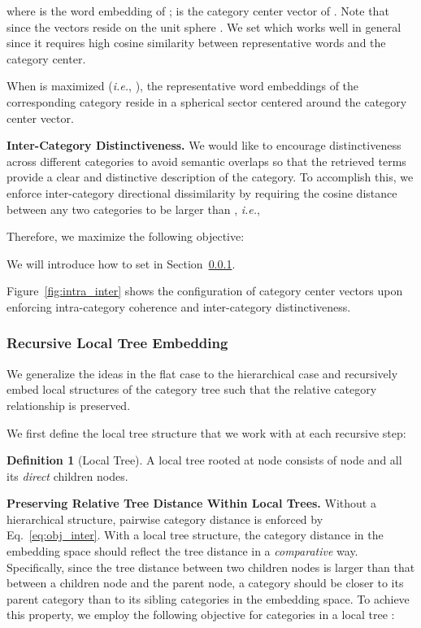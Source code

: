\documentclass[sigconf]{acmart}
\newcommand{\ie}{\emph{i.e.}}
\theoremstyle{definition}
\newtheorem{definition}{Definition}
\begin{document}
where  is the word embedding of ;  is the category center vector of . Note that  since the vectors reside on the unit sphere .
We set  which works well in general since it requires high cosine similarity between representative words and the category center.

When  is maximized (\ie, ), the representative word embeddings of the corresponding category reside in a spherical sector centered around the category center vector.

\noindent
\textbf{Inter-Category Distinctiveness.}
We would like to encourage distinctiveness across different categories to avoid semantic overlaps so that the retrieved terms provide a clear and distinctive description of the category. To accomplish this, we enforce inter-category directional dissimilarity by requiring the cosine distance between any two categories to be larger than , \ie,

Therefore, we maximize the following objective:

We will introduce how to set  in Section~\ref{sec:recursive}.

Figure~\ref{fig:intra_inter} shows the configuration of category center vectors upon enforcing intra-category coherence and inter-category distinctiveness.


\subsubsection{Recursive Local Tree Embedding}
\label{sec:recursive}
We generalize the ideas in the flat case to the hierarchical case and recursively embed local structures of the category tree such that the relative category relationship is preserved.

We first define the local tree structure that we work with at each recursive step:
\begin{definition} [Local Tree]
A local tree  rooted at node  consists of node  and all its \emph{direct} children nodes.
\end{definition}


\noindent
\textbf{Preserving Relative Tree Distance Within Local Trees.}
Without a hierarchical structure, pairwise category distance is enforced by Eq.~\eqref{eq:obj_inter}. With a local tree structure, the category distance in the embedding space should reflect the tree distance in a \emph{comparative} way. Specifically, since the tree distance between two children nodes is larger than that between a children node and the parent node, a category should be closer to its parent category than to its sibling categories in the embedding space. To achieve this property, we employ the following objective for categories in a local tree :
\end{document}
